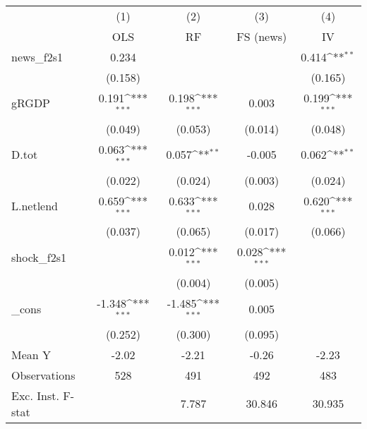 {
\def\sym#1{\ifmmode^{#1}\else\(^{#1}\)\fi}
\begin{tabular}{l*{4}{c}}
\toprule
            &\multicolumn{1}{c}{(1)}&\multicolumn{1}{c}{(2)}&\multicolumn{1}{c}{(3)}&\multicolumn{1}{c}{(4)}\\
            &\multicolumn{1}{c}{OLS}&\multicolumn{1}{c}{RF}&\multicolumn{1}{c}{FS (news)}&\multicolumn{1}{c}{IV}\\
\midrule
news\_f2s1   &       0.234         &                     &                     &       0.414\sym{**} \\
            &     (0.158)         &                     &                     &     (0.165)         \\
\addlinespace
gRGDP       &       0.191\sym{***}&       0.198\sym{***}&       0.003         &       0.199\sym{***}\\
            &     (0.049)         &     (0.053)         &     (0.014)         &     (0.048)         \\
\addlinespace
D.tot       &       0.063\sym{***}&       0.057\sym{**} &      -0.005         &       0.062\sym{**} \\
            &     (0.022)         &     (0.024)         &     (0.003)         &     (0.024)         \\
\addlinespace
L.netlend   &       0.659\sym{***}&       0.633\sym{***}&       0.028         &       0.620\sym{***}\\
            &     (0.037)         &     (0.065)         &     (0.017)         &     (0.066)         \\
\addlinespace
shock\_f2s1  &                     &       0.012\sym{***}&       0.028\sym{***}&                     \\
            &                     &     (0.004)         &     (0.005)         &                     \\
\addlinespace
\_cons      &      -1.348\sym{***}&      -1.485\sym{***}&       0.005         &                     \\
            &     (0.252)         &     (0.300)         &     (0.095)         &                     \\
\midrule
Mean Y      &       -2.02         &       -2.21         &       -0.26         &       -2.23         \\
Observations&         528         &         491         &         492         &         483         \\
Exc. Inst. F-stat&                     &       7.787         &      30.846         &      30.935         \\
\bottomrule
\end{tabular}
}
